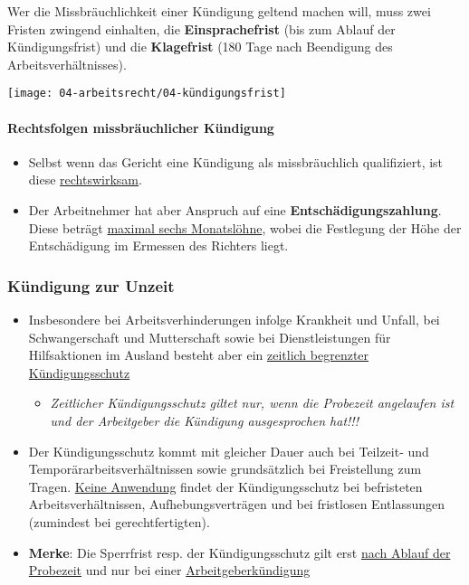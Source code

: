 Wer die Missbräuchlichkeit einer Kündigung geltend machen will, muss zwei Fristen zwingend einhalten, die \textbf{Einsprachefrist} (bis zum Ablauf der Kündigungsfrist) und die \textbf{Klagefrist} (180 Tage nach Beendigung des
Arbeitsverhältnisses).

\begin{center}
    \texttt{[image: 04-arbeitsrecht/04-kündigungsfrist]}
\end{center}

\paragraph{Rechtsfolgen missbräuchlicher Kündigung}
\begin{itemize}
    \item Selbst wenn das Gericht eine Kündigung als missbräuchlich qualifiziert, ist diese \underline{rechtswirksam}.
    \item Der Arbeitnehmer hat aber Anspruch auf eine \textbf{Entschädigungszahlung}. Diese beträgt \underline{maximal sechs Monatslöhne}, wobei die Festlegung der Höhe der Entschädigung im Ermessen des Richters liegt.
\end{itemize}

\subsubsection{Kündigung zur Unzeit}
\begin{itemize}
    \item Insbesondere bei Arbeitsverhinderungen infolge Krankheit und Unfall, bei Schwangerschaft und Mutterschaft sowie bei Dienstleistungen für Hilfsaktionen im Ausland besteht aber ein \underline{zeitlich begrenzter Kündigungsschutz}
    \begin{itemize}
        \item \textit{Zeitlicher Kündigungsschutz giltet nur, wenn die Probezeit angelaufen ist und der Arbeitgeber die Kündigung ausgesprochen hat!!!}
    \end{itemize}
    \item Der Kündigungsschutz kommt mit gleicher Dauer auch bei Teilzeit- und Temporärarbeitsverhältnissen sowie grundsätzlich bei Freistellung zum Tragen. \underline{Keine Anwendung} findet der Kündigungsschutz bei befristeten Arbeitsverhältnissen, Aufhebungsverträgen und bei fristlosen Entlassungen (zumindest bei gerechtfertigten).
    \item \textbf{Merke}: Die Sperrfrist resp. der Kündigungsschutz gilt erst \underline{nach Ablauf der Probezeit} und nur bei einer \underline{Arbeitgeberkündigung}
\end{itemize}

